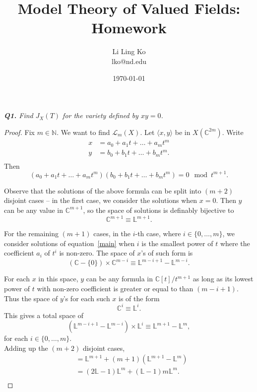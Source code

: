 \documentclass{article}
\begin{document}
\title{Model Theory of Valued Fields: Homework}
\author{Li Ling Ko\\ lko@nd.edu}
\date{\today}
\maketitle

\it \textbf{Q1.} Find $J_X(T)$ for the variety defined by $xy=0$.
\begin{proof}
  Fix $m\in\mathbb{N}$. We want to find $\mathcal{L}_m(X)$. Let $\langle x,
  y\rangle$ be in $X(\mathbb{C}^{2m})$. Write
  \begin{align*}
    x &=a_0+a_1t+\ldots+a_mt^m\\
    y &=b_0+b_1t+\ldots+b_mt^m.\\
  \end{align*}
  Then
  \begin{equation}
    \label{main}
    (a_0+a_1t+\ldots+a_mt^m) (b_0+b_1t+\ldots+b_mt^m)=0 \mod t^{m+1}.
  \end{equation}

  Observe that the solutions of the above formula can be split into $(m+2)$
  disjoint cases -- in the first case, we consider the solutions when
  $x=0$. Then $y$ can be any value in $\mathbb{C}^{m+1}$, so the space of
  solutions is definably bijective to 
  \[\mathbb{C}^{m+1} \equiv \mathbb{L}^{m+1}.\]

  For the remaining $(m+1)$ cases, in the $i$-th case, where
  $i\in\{0,\ldots,m\}$, we consider solutions of equation~\eqref{main} when
  $i$ is the smallest power of $t$ where the coefficient $a_i$ of $t^i$ is
  non-zero. The space of $x$'s of such form is
  \[(\mathbb{C}-\{0\}) \times\mathbb{C}^{m-i} \equiv
  \mathbb{L}^{m-i+1}-\mathbb{L}^{m-i}.\]

  For each $x$ in this space, $y$ can be any formula in
  $\mathbb{C}[t]/t^{m+1}$ as long as its lowest power of $t$ with non-zero
  coefficient is greater or equal to than $(m-i+1)$. Thus the space of
  $y$'s for each such $x$ is of the form
  \[\mathbb{C}^{i} \equiv \mathbb{L}^{i}.\]
  This gives a total space of
  \[(\mathbb{L}^{m-i+1}-\mathbb{L}^{m-i}) \times\mathbb{L}^{i} \equiv
  \mathbb{L}^{m+1}-\mathbb{L}^{m},\]
  for each $i\in\{0,\ldots,m\}$. \\

  Adding up the $(m+2)$ disjoint cases,
  \begin{align*}
    [\mathcal{L}_m(X)] &=\mathbb{L}^{m+1}
      +(m+1)(\mathbb{L}^{m+1}-\mathbb{L}^{m})\\
      &=(2\mathbb{L}-1)\mathbb{L}^m +(\mathbb{L}-1)m\mathbb{L}^m.\\
  \end{align*}


\end{proof}
\end{document}
